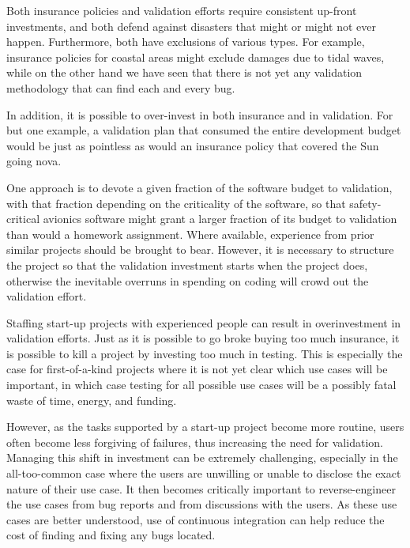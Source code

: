 Both insurance policies and validation efforts require consistent
up-front investments, and both defend against disasters that might
or might not ever happen.
Furthermore, both have exclusions of various types.
For example, insurance policies for coastal areas might exclude
damages due to tidal waves, while on the other hand we have seen
that there is not yet any validation methodology that can find
each and every bug.

In addition, it is possible to over-invest in both insurance and
in validation.
For but one example, a validation plan that consumed the entire
development budget would be just as pointless as would an insurance
policy that covered the Sun going nova.

One approach is to devote a given fraction of the software budget to
validation, with that fraction depending on the criticality of the
software, so that safety-critical avionics software might grant a
larger fraction of its budget to validation than would a homework
assignment.
Where available, experience from prior similar projects should be
brought to bear.
However, it is necessary to structure the project so that the validation
investment starts when the project does, otherwise the inevitable overruns
in spending on coding will crowd out the validation effort.

Staffing start-up projects with experienced people can result in
overinvestment in validation efforts.
Just as it is possible to go broke buying too much insurance, it is
possible to kill a project by investing too much in testing.
This is especially the case for first-of-a-kind projects where it is
not yet clear which use cases will be important, in which case testing
for all possible use cases will be a possibly fatal waste of time,
energy, and funding.

However, as the tasks supported by a start-up project become more routine,
users often become less forgiving of failures, thus increasing the need
for validation.
Managing this shift in investment can be extremely challenging,
especially in the all-too-common case where the users are unwilling
or unable to disclose the exact nature of their use case.
It then becomes critically important to reverse-engineer the
use cases from bug reports and from discussions with the users.
As these use cases are better understood, use of continuous integration
can help reduce the cost of finding and fixing any bugs located.


